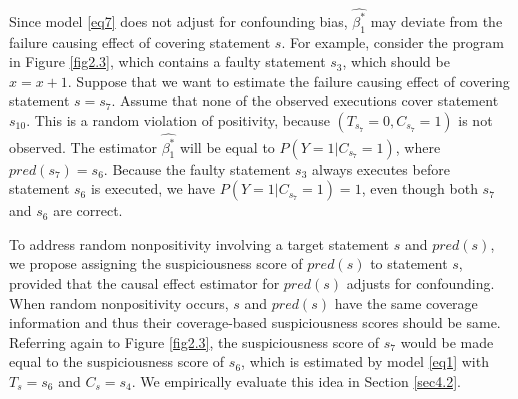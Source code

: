 Since model \eqref{eq7} does not adjust for confounding bias, $\widehat {\beta _1^*}$ may 
deviate from the failure causing effect of covering statement $s$.  For example, consider the program in Figure \ref{fig2.3}, which contains a faulty statement $s_3$, which should be $x=x+1$.  
Suppose that we want to estimate the failure causing effect of covering statement $s=s_7$.  
Assume that none of the observed executions cover statement $s_10$.  
This is a random violation of positivity, because $(T_{s_7}=0,C_{s_7}=1)$ is not observed.  
The estimator $\widehat{\beta_1^*}$ will be equal to $P(Y=1|C_{s_7}=1)$, where $pred({s_7})=s_6$.  
Because the faulty statement $s_3$ always executes before statement $s_6$ is executed, 
we have $P(Y=1|C_{{s_7}}=1)=1$, even though both $s_7$ and $s_6$ are correct.

To address random nonpositivity involving a target statement $s$ and $pred(s)$, 
we propose assigning the suspiciousness score of $pred(s)$ to statement $s$, 
provided that the causal effect estimator for $pred(s)$ adjusts for confounding.  
When random nonpositivity occurs, $s$ and $pred(s)$ have the same coverage information 
and thus their coverage-based suspiciousness scores should be same.  Referring again to Figure \ref{fig2.3}, 
the suspiciousness score of $s_7$ would be made equal to the suspiciousness score of $s_6$, 
which is estimated by model \eqref{eq1} with $T_s=s_6$ and $C_s=s_4$.  
We empirically evaluate this idea in Section \ref{sec4.2}.

